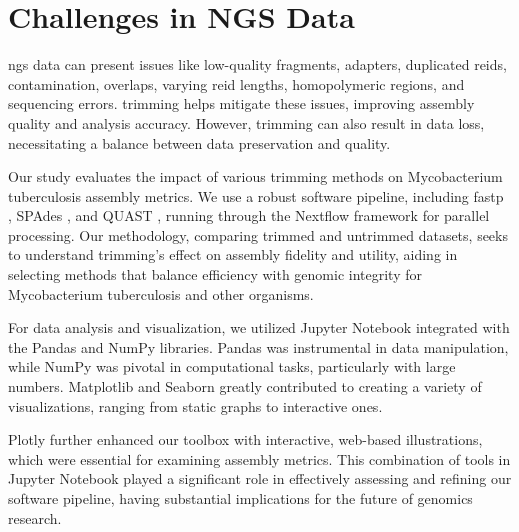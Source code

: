 \section{Challenges in NGS Data}

\gls{ngs} data can present issues like low-quality fragments, adapters, duplicated reids, contamination, overlaps, varying reid lengths, homopolymeric regions, and sequencing errors. \gls{trimming} helps mitigate these issues, improving \gls{assembly} quality and analysis accuracy. However, \gls{trimming} can also result in data loss, necessitating a balance between data preservation and quality.

Our study evaluates the impact of various \gls{trimming} methods on Mycobacterium tuberculosis \gls{assembly} metrics. We use a robust software pipeline, including fastp \cite{fastp}, SPAdes \cite{spades}, and QUAST \cite{quast}, running through the Nextflow framework \cite{nextflow} for parallel processing. Our methodology, comparing trimmed and untrimmed datasets, seeks to understand \gls{trimming}'s effect on \gls{assembly} fidelity and utility, aiding in selecting methods that balance efficiency with genomic integrity for Mycobacterium tuberculosis and other organisms.

For data analysis and visualization, we utilized Jupyter Notebook \cite{notebook} integrated with the Pandas \cite{pandas} and NumPy \cite{numpy} libraries. Pandas was instrumental in data manipulation, while NumPy was pivotal in computational tasks, particularly with large numbers. Matplotlib \cite{matplotlib} and Seaborn \cite{seaborn} greatly contributed to creating a variety of visualizations, ranging from static graphs to interactive ones.

Plotly \cite{plotly} further enhanced our toolbox with interactive, web-based illustrations, which were essential for examining \gls{assembly} metrics. This combination of tools in Jupyter Notebook played a significant role in effectively assessing and refining our software pipeline, having substantial implications for the future of genomics research.





